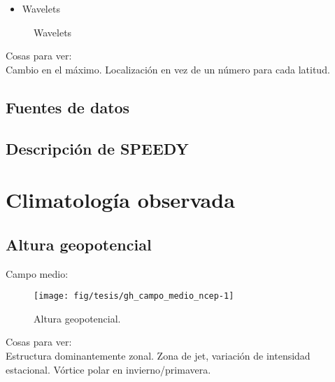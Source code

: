 \documentclass[spanish,a4paper]{book}
\providecommand{\tightlist}{%
  \setlength{\itemsep}{0pt}\setlength{\parskip}{0pt}}
\begin{document}
\begin{itemize}
\tightlist
\item
  Wavelets
\end{itemize}

\begin{figure*}
\newline{}\caption{Wavelets}\label{fig:wavelet_ejemplo}
\end{figure*}

Cosas para ver:\\
Cambio en el máximo. Localización en vez de un número para cada latitud.

\section{Fuentes de datos}\label{fuentes-de-datos}

\section{Descripción de SPEEDY}\label{descripcion-de-speedy}

\chapter{Climatología observada}\label{climatologia-observada}

\section{Altura geopotencial}\label{altura-geopotencial}

Campo medio:

\begin{figure}

{\centering \texttt{[image: fig/tesis/gh\_campo\_medio\_ncep-1]} 

}

\caption{Altura geopotencial.}\label{fig:gh_campo_medio_ncep}
\end{figure}

Cosas para ver:\\
Estructura dominantemente zonal. Zona de jet, variación de intensidad
estacional. Vórtice polar en invierno/primavera.
\end{document}
